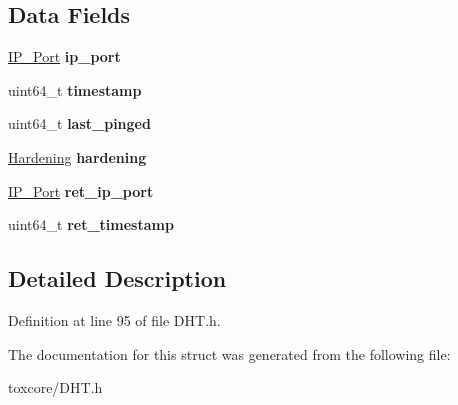 \subsection*{Data Fields}
\begin{DoxyCompactItemize}
\item 
\hypertarget{struct_i_p_p_ts_png_a86e2a5a56c0dd22df6e8b8a10e40f9e4}{\hyperlink{struct_i_p___port}{I\+P\+\_\+\+Port} {\bfseries ip\+\_\+port}}\label{struct_i_p_p_ts_png_a86e2a5a56c0dd22df6e8b8a10e40f9e4}

\item 
\hypertarget{struct_i_p_p_ts_png_a465bef81f6478756e5443025b1f2ddfa}{uint64\+\_\+t {\bfseries timestamp}}\label{struct_i_p_p_ts_png_a465bef81f6478756e5443025b1f2ddfa}

\item 
\hypertarget{struct_i_p_p_ts_png_a4049204f6c392628d31be6c39f03e031}{uint64\+\_\+t {\bfseries last\+\_\+pinged}}\label{struct_i_p_p_ts_png_a4049204f6c392628d31be6c39f03e031}

\item 
\hypertarget{struct_i_p_p_ts_png_a247a5bc6669d45b7241b58223ce8fd1d}{\hyperlink{struct_hardening}{Hardening} {\bfseries hardening}}\label{struct_i_p_p_ts_png_a247a5bc6669d45b7241b58223ce8fd1d}

\item 
\hypertarget{struct_i_p_p_ts_png_a28f2dcc657352ee4855d05ed42e4a4af}{\hyperlink{struct_i_p___port}{I\+P\+\_\+\+Port} {\bfseries ret\+\_\+ip\+\_\+port}}\label{struct_i_p_p_ts_png_a28f2dcc657352ee4855d05ed42e4a4af}

\item 
\hypertarget{struct_i_p_p_ts_png_a5a40b83400feebb632862f593ad5e4a7}{uint64\+\_\+t {\bfseries ret\+\_\+timestamp}}\label{struct_i_p_p_ts_png_a5a40b83400feebb632862f593ad5e4a7}

\end{DoxyCompactItemize}


\subsection{Detailed Description}


Definition at line 95 of file D\+H\+T.\+h.



The documentation for this struct was generated from the following file\+:\begin{DoxyCompactItemize}
\item 
toxcore/D\+H\+T.\+h\end{DoxyCompactItemize}
